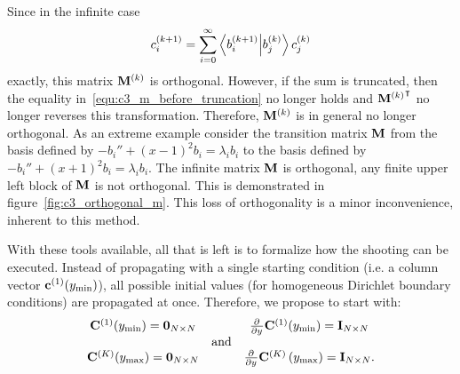 Since in the infinite case
\begin{equation}\label{equ:c3_m_before_truncation}
  c^{(k+1)}_i = \sum_{i=0}^{\infty} \bra{b_i^{(k+1)}}\ket{b_j^{(k)}} c^{(k)}_j
\end{equation}
exactly, this matrix $\vb{M}^{(k)}$ is orthogonal. However, if the sum is truncated, then the equality in~\eqref{equ:c3_m_before_truncation} no longer holds and ${\vb{M}^{(k)}}^\intercal$ no longer reverses this transformation. Therefore, $\vb{M}^{(k)}$ is in general no longer orthogonal. As an extreme example consider the transition matrix $\vb{M}$ from the basis defined by $-b_i'' + (x-1)^2 b_i = \lambda_i b_i$ to the basis defined by $-b_i'' + (x+1)^2 b_i = \lambda_i b_i$. The infinite matrix $\vb{M}$ is orthogonal, any finite upper left block of $\vb{M}$ is not orthogonal. This is demonstrated in figure~\ref{fig:c3_orthogonal_m}. This loss of orthogonality is a minor inconvenience, inherent to this method.

With these tools available, all that is left is to formalize how the shooting can be executed. Instead of propagating with a single starting condition (i.e. a column vector $\vb{c}^{(1)}({y_{\text{min}}})$), all possible initial values (for homogeneous Dirichlet boundary conditions) are propagated at once. Therefore, we propose to start with:
$$
  \begin{matrix}
    \vb{C}^{(1)}({y_{\text{min}}}) = \vb{0}_{N\times N} &            & {\pdv[]{}{y}}\vb{C}^{(1)}({y_{\text{min}}}) = \vb{I}_{N\times N}                    \\
                                             & \text{and} &                                                                          \\
    \vb{C}^{(K)}({y_{\text{max}}}) = \vb{0}_{N\times N} &            & {\pdv[]{}{y}}\vb{C}^{(K)}\left({y_{\text{max}}}\right) = \vb{I}_{N\times N}\text{.}
  \end{matrix}
$$


